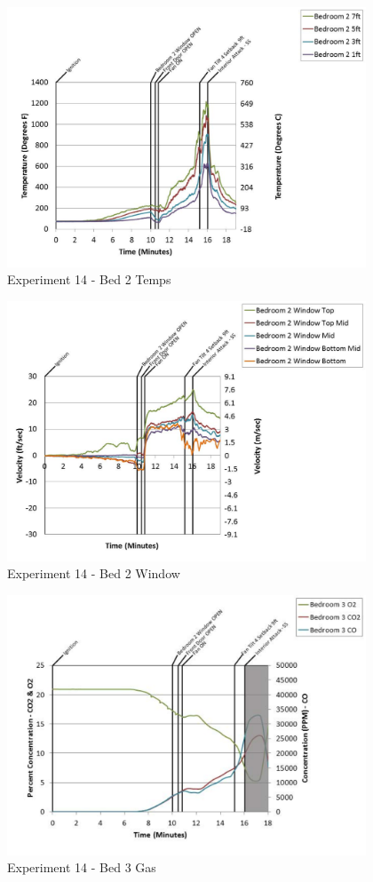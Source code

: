 \documentclass{article}
\begin{document}
\begin{appendices}
	\clearpage

	\begin{figure}[h!]
		\centering
		\includegraphics[height=3.05in]{0_Images/Results_Charts/Exp_14_Charts/Bed2Temps.pdf}
		\caption{Experiment 14 - Bed 2 Temps}
	\end{figure}
 

	\begin{figure}[h!]
		\centering
		\includegraphics[height=3.05in]{0_Images/Results_Charts/Exp_14_Charts/Bed2Window.pdf}
		\caption{Experiment 14 - Bed 2 Window}
	\end{figure}
 
	\clearpage

	\begin{figure}[h!]
		\centering
		\includegraphics[height=3.05in]{0_Images/Results_Charts/Exp_14_Charts/Bed3Gas.pdf}
		\caption{Experiment 14 - Bed 3 Gas}
	\end{figure}
 


\end{appendices}
\end{document}

